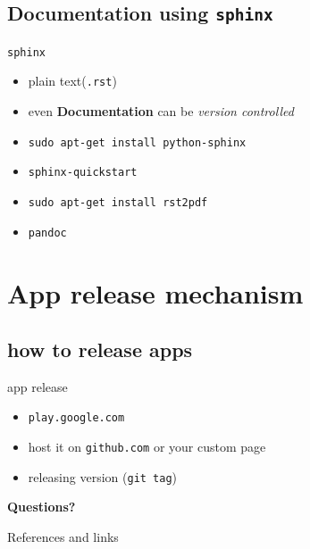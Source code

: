 \documentclass{beamer}
\begin{document}
 \subsection{Documentation using {\tt sphinx}}
 \begin{frame}{{\tt sphinx}}
   \begin{itemize}
   \item plain text({\tt .rst})
   \item even {\bf Documentation} can be {\em version controlled}
   \end{itemize}
   \begin{block}{}
     \begin{itemize}
     \item {\tt sudo apt-get install python-sphinx}
     \item {\tt sphinx-quickstart} \pause
     \item {\tt sudo apt-get install rst2pdf}
     \item {\tt pandoc}
     \end{itemize} \pause
   \end{block}
 \end{frame}

\section{App release mechanism}
\subsection{how to release apps}
\begin{frame}{app release}
    \begin{itemize}
    \item {\tt play.google.com}
    \item host it on {\tt github.com} or your custom page
    \item releasing version ({\tt git tag})
    \end{itemize}
\end{frame}

\begin{frame}{}
  \centerline{\bf Questions?}
\end{frame}

\begin{frame}{References and links}
\end{frame}
\end{document}
